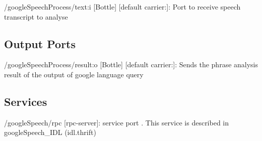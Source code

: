 \begin{DoxyItemize}
\item /google\+Speech\+Process/text\+:i \mbox{[}Bottle\mbox{]} \mbox{[}default carrier\+:\mbox{]}\+: Port to receive speech transcript to analyse
\end{DoxyItemize}\hypertarget{group__skeletonViewer_outputports_sec}{}\subsection{Output Ports}\label{group__skeletonViewer_outputports_sec}

\begin{DoxyItemize}
\item /google\+Speech\+Process/result\+:o \mbox{[}Bottle\mbox{]} \mbox{[}default carrier\+:\mbox{]}\+: Sends the phrase analysis result of the output of google language query
\end{DoxyItemize}\hypertarget{group__skeletonViewer_services_sec}{}\subsection{Services}\label{group__skeletonViewer_services_sec}

\begin{DoxyItemize}
\item /google\+Speech/rpc \mbox{[}rpc-\/server\mbox{]}\+: service port . This service is described in google\+Speech\+\_\+\+I\+DL (idl.\+thrift) 
\end{DoxyItemize}